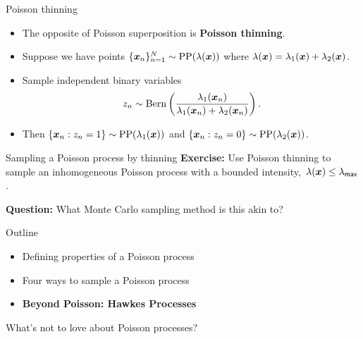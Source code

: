 \documentclass[aspectratio=169]{beamer}
\begin{document}
\begin{frame}{Poisson thinning}
\begin{itemize}
    \itemsep1em
    
    \item The opposite of Poisson superposition is \textbf{Poisson thinning}. 
    
    \item Suppose we have points $\{\boldsymbol{x}_n\}_{n=1}^N \sim \mathrm{PP}(\lambda(\boldsymbol{x}))$ where $\lambda(\boldsymbol{x}) = \lambda_1(\boldsymbol{x}) + \lambda_2(\boldsymbol{x})$.
    
    \item Sample independent binary variables 
    \begin{align}
        z_n \sim \mathrm{Bern}\left(\frac{\lambda_1(\boldsymbol{x}_n)}{\lambda_1(\boldsymbol{x}_n) + \lambda_2(\boldsymbol{x}_n)} \right).
    \end{align}
    
    \item Then $\{\boldsymbol{x}_n: z_n = 1\} \sim \mathrm{PP}(\lambda_1(\boldsymbol{x}))$ and $\{\boldsymbol{x}_n: z_n = 0\} \sim \mathrm{PP}(\lambda_2(\boldsymbol{x}))$.
\end{itemize}
\end{frame}

\begin{frame}[t]{Sampling a Poisson process by thinning}
\textbf{Exercise:} Use Poisson thinning to sample an inhomogeneous Poisson process with a bounded intensity,~$\lambda(\boldsymbol{x}) \leq \lambda_{\mathsf{max}}$.

\textbf{Question:} What Monte Carlo sampling method is this akin to?
\end{frame}

\begin{frame}{Outline}
\begin{itemize}
    \item Defining properties of a Poisson process
    \item Four ways to sample a Poisson process
    \item \textbf{Beyond Poisson: Hawkes Processes}
\end{itemize}
\end{frame}

\begin{frame}{What's not to love about Poisson processes?}
    
\end{frame}
\end{document}
